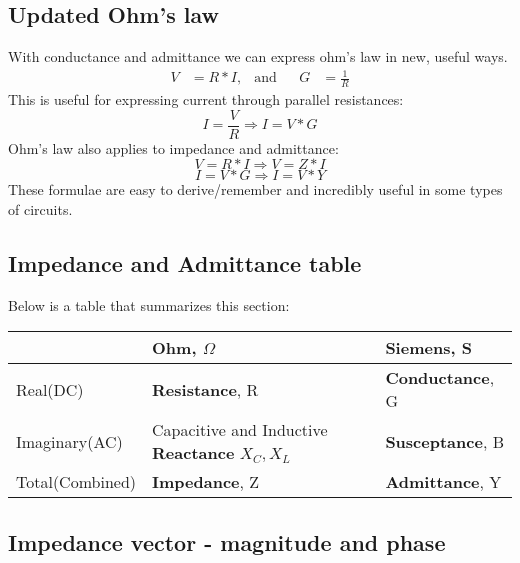 \subsection{Updated Ohm's law}
With conductance and admittance we can express ohm's law in new, useful ways.
\begin{align*}
    V &= R*I, &\text{and}&&G &= \frac{1}{R}
\end{align*}
This is useful for expressing current through parallel resistances:
\begin{equation}\label{eq:ohmconductance}
    I = \frac{V}{R} \Rightarrow I = V*G
\end{equation}
Ohm's law also applies to impedance and admittance:
\begin{equation}\label{eq:ohmimpedance}
    V = R * I \Rightarrow V = Z * I
\end{equation}
\begin{equation}\label{eq:ohmadmittance}
    I = V * G \Rightarrow I = V * Y
\end{equation}
These formulae are easy to derive/remember and incredibly useful in some types 
of circuits.
\subsection{Impedance and Admittance table}
Below is a table that summarizes this section:\\
\newline
\begin{tabular}{| l | l | l |}
\hline
& Ohm, $\Omega$ & Siemens, S \\ \hline
Real(DC) & \textbf{Resistance}, R & \textbf{Conductance}, G \\
\hline
Imaginary(AC) & Capacitive and Inductive \textbf{Reactance} $X_C, X_L$ 
& \textbf{Susceptance}, B \\ 
\hline
Total(Combined)& \textbf{Impedance}, Z & \textbf{Admittance}, Y \\ 
\hline
\end{tabular}
\subsection{Impedance vector - magnitude and phase}
